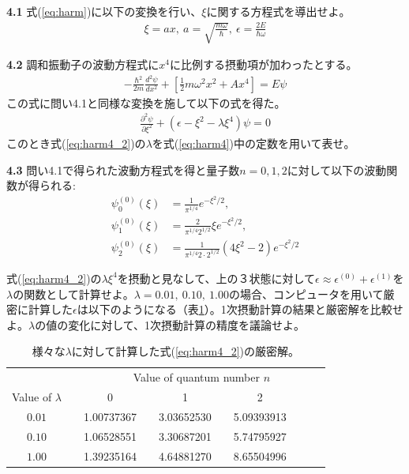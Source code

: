 \documentclass[11pt,pra,aps]{revtex4}
\begin{document}
\noindent
{\bf 4.1} 式(\ref{eq:harm})に以下の変換を行い、$\xi$に関する方程式を導出せよ。
\begin{align}
  \xi=ax,\ a=\sqrt{\frac{m\omega}{\hbar}},\ \epsilon=\frac{2E}{\hbar\omega}
\end{align}

\noindent
{\bf 4.2} 調和振動子の波動方程式に$x^4$に比例する摂動項が加わったとする。
\begin{align}
  -\frac{\hbar^2}{2m}\frac{d^2\psi}{dx^2}+\left[\frac{1}{2}m\omega^2x^2+Ax^4\right]=E\psi \label{eq:harm4}
\end{align}
この式に問い4.1と同様な変換を施して以下の式を得た。
\begin{align}
  \frac{\partial^2\psi}{\partial \xi^2}+(\epsilon-\xi^2-\lambda\xi^4)\psi=0 \label{eq:harm4_2}
\end{align}
このとき式(\ref{eq:harm4_2})の$\lambda$を式(\ref{eq:harm4})中の定数を用いて表せ。

\noindent
{\bf 4.3} 問い4.1で得られた波動方程式を得と量子数$n=0,1,2$に対して以下の波動関数が得られる:
\begin{align}
  \psi_0^{(0)}(\xi)&=\frac{1}{\pi^{1/4}} e^{-\xi^2/2}, \\
  \psi_1^{(0)}(\xi)&=\frac{2}{\pi^{1/4}2^{1/2}} \xi e^{-\xi^2/2}, \\
  \psi_2^{(0)}(\xi)&=\frac{1}{\pi^{1/4}2\cdot 2^{1/2}} (4\xi^2-2)e^{-\xi^2/2}
\end{align}

式(\ref{eq:harm4_2})の$\lambda\xi^4$を摂動と見なして、上の３状態に対して$\epsilon\approx\epsilon^{(0)}+\epsilon^{(1)}$を$\lambda$の関数として計算せよ。$\lambda=0.01,\ 0.10,\ 1.00$の場合、コンピュータを用いて厳密に計算した$\epsilon$は以下のようになる（表\ref{tab:exact}）。1次摂動計算の結果と厳密解を比較せよ。$\lambda$の値の変化に対して、1次摂動計算の精度を議論せよ。

\begin{longtable}[!h]{cccccccccc}
  \caption{\label{tab:exact} 様々な$\lambda$に対して計算した式(\ref{eq:harm4_2})の厳密解。}\\
  \hline
  \hline
  {}    && \multicolumn{8}{c}{Value of quantum number $n$} \\
  \cline{3-10}
  Value of $\lambda$    && 0 && 1 && 2 \\
  \hline
  $0.01$ && 1.00737367 && 3.03652530 && 5.09393913 \\
  $0.10$ && 1.06528551 && 3.30687201 && 5.74795927 \\
  $1.00$ && 1.39235164 && 4.64881270 && 8.65504996 \\
  \hline
  \hline        
\end{longtable}
\end{document}

